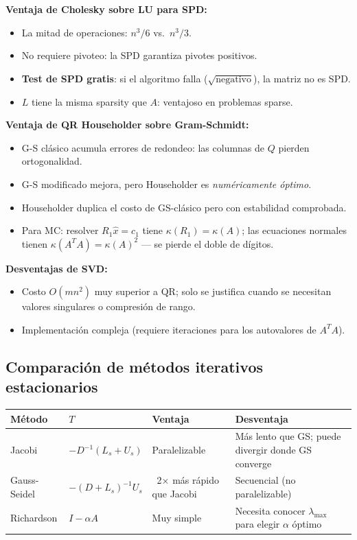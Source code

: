 \documentclass[12pt,a4paper]{article}
\begin{document}
\textbf{Ventaja de Cholesky sobre LU para SPD:}
\begin{itemize}[noitemsep]
  \item La mitad de operaciones: $n^3/6$ vs.\ $n^3/3$.
  \item No requiere pivoteo: la SPD garantiza pivotes positivos.
  \item \textbf{Test de SPD gratis}: si el algoritmo falla ($\sqrt{\text{negativo}}$), la matriz no es SPD.
  \item $L$ tiene la misma sparsity que $A$: ventajoso en problemas sparse.
\end{itemize}

\textbf{Ventaja de QR Householder sobre Gram-Schmidt:}
\begin{itemize}[noitemsep]
  \item G-S clásico acumula errores de redondeo: las columnas de $Q$ pierden ortogonalidad.
  \item G-S modificado mejora, pero Householder es \emph{numéricamente óptimo}.
  \item Householder duplica el costo de GS-clásico pero con estabilidad comprobada.
  \item Para MC: resolver $R_1\hat x=c_1$ tiene $\kappa(R_1)=\kappa(A)$; las ecuaciones normales tienen $\kappa(A^TA)=\kappa(A)^2$ --- se pierde el doble de dígitos.
\end{itemize}

\textbf{Desventajas de SVD:}
\begin{itemize}[noitemsep]
  \item Costo $O(mn^2)$ muy superior a QR; solo se justifica cuando se necesitan valores singulares o compresión de rango.
  \item Implementación compleja (requiere iteraciones para los autovalores de $A^TA$).
\end{itemize}

\subsection{Comparación de métodos iterativos estacionarios}

\begin{center}
\renewcommand{\arraystretch}{1.3}
\begin{tabular}{lllp{6cm}}
\toprule
\textbf{Método} & \textbf{$T$} & \textbf{Ventaja} & \textbf{Desventaja} \\
\midrule
Jacobi & $-D^{-1}(L_s+U_s)$ & Paralelizable & Más lento que GS; puede divergir donde GS converge \\
Gauss-Seidel & $-(D+L_s)^{-1}U_s$ & ~2× más rápido que Jacobi & Secuencial (no paralelizable) \\
Richardson & $I-\alpha A$ & Muy simple & Necesita conocer $\lambda_{\max}$ para elegir $\alpha$ óptimo \\
\bottomrule
\end{tabular}
\end{center}
\end{document}
